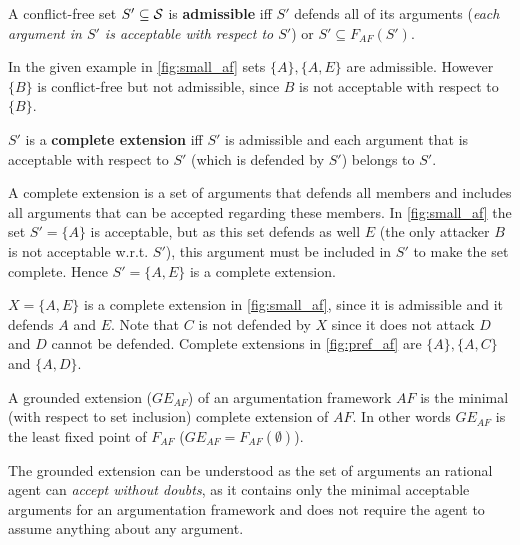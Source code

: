 \begin{definition}
	A conflict-free set $S' \subseteq \S$ is \textbf{admissible} iff $S'$ defends all of its arguments (\textit{each argument in $S'$ is acceptable with respect to $S'$}) or $S' \subseteq F_{AF}(S')$.
\end{definition}

\begin{exa}
In the given example in \autoref{fig:small_af} sets $\{A\}, \{A, E\}$ are admissible. However $\{B\}$ is conflict-free but not admissible, since $B$ is not acceptable with respect to $\{B\}$.
\end{exa}

\begin{definition}
$S'$ is a \textbf{complete extension} iff  $S'$ is admissible and each argument that is acceptable with respect to $S'$ (which is defended by $S'$) belongs to $S'$.
\end{definition}

\begin{remark}
	A complete extension is a set of arguments that defends all members and includes all arguments that can be accepted regarding these members. In \autoref{fig:small_af} the set $S'=\{A\}$ is acceptable, but as this set defends as well $E$ (the only attacker $B$ is not acceptable w.r.t. $S'$), this argument must be included in $S'$ to make the set complete. Hence $S' = \{A, E\}$ is a complete extension. 
\end{remark}


\begin{exa}
$X = \{A, E\}$ is a complete extension in \autoref{fig:small_af}, since it is admissible and it defends $A$ and $E$. Note that $C$ is not defended by $X$ since it does not attack $D$ and $D$ cannot be defended.
Complete extensions in \autoref{fig:pref_af} are $\{A\}, \{A, C\}$ and $\{A, D\}$.
\end{exa}


\begin{definition}
A grounded extension ($GE_{AF}$) of an argumentation framework $AF$ is the minimal (with respect to set inclusion) complete extension of $AF$. In other words $GE_{AF}$ is the least fixed point of $F_{AF}$ ($GE_{AF} = F_{AF}(\emptyset)$).
\end{definition}

\begin{remark}
	The grounded extension can be understood as the set of arguments an rational agent can \textit{accept without doubts}, as it contains only the minimal acceptable arguments for an argumentation framework and does not require the agent to assume anything about any argument.
\end{remark}

